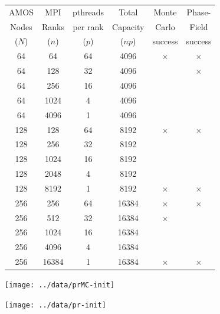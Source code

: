 \documentclass[11pt]{article}
\begin{document}
\begin{multicols*}{2}
\begin{center}
\begin{minipage}{0.45\textwidth}
\begin{footnotesize}
\begin{tabular}{|cccc|cc|}\hline
AMOS  	& MPI 	& pthreads & Total	& Monte	& Phase-\\
Nodes	& Ranks & per rank & Capacity	& Carlo	& Field\\
($N$)	& ($n$)	& ($p$)	& ($np$)	& success & success\\\hline
64	& 64	& 64	& 4096	&$\times$ &$\times$ \\
64	& 128	& 32	& 4096	&\checkmark &$\times$ \\
64	& 256	& 16	& 4096	&\checkmark &\checkmark \\
64	& 1024	& 4	& 4096	&\checkmark &\checkmark \\
64	& 4096	& 1	& 4096	&\checkmark &\checkmark \\\hline
128	& 128	& 64	& 8192	&$\times$ &$\times$ \\
128	& 256	& 32	& 8192	&\checkmark &\checkmark \\
128	& 1024	& 16	& 8192	&\checkmark &\checkmark \\
128	& 2048	& 4	& 8192	&\checkmark &\checkmark \\
128	& 8192	& 1	& 8192	&$\times$ &$\times$ \\\hline
256	& 256	& 64	& 16384	&$\times$ &$\times$\\
256	& 512	& 32	& 16384	&$\times$ &\checkmark \\
256	& 1024	& 16	& 16384	&\checkmark &\checkmark \\
256	& 4096	& 4	& 16384	&\checkmark &\checkmark \\
256	& 16384	& 1	& 16384	&$\times$ &$\times$ \\\hline
\end{tabular}
\end{footnotesize}
\end{minipage}
\end{center}

\begin{center}
\begin{minipage}{0.4\textwidth}\centering
  \texttt{[image: ../data/prMC-init]}
\end{minipage}
\begin{minipage}{0.4\textwidth}\centering
  \texttt{[image: ../data/pr-init]}
\end{minipage}
\end{center}


\end{multicols*}
\end{document}
